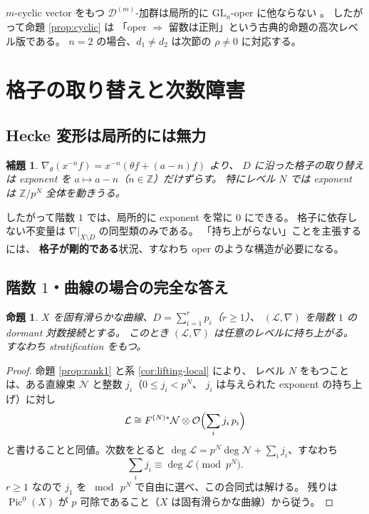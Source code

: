 \documentclass[a4paper,11pt]{ltjsarticle}
\theoremstyle{plain}
\newtheorem{proposition}[theorem]{命題}
\newtheorem{lemma}[theorem]{補題}
\theoremstyle{definition}
\newcommand{\bbZ}{\mathbb{Z}}
\newcommand{\cD}{\mathcal{D}}
\newcommand{\cL}{\mathcal{L}}
\newcommand{\cN}{\mathcal{N}}
\newcommand{\cO}{\mathcal{O}}
\newcommand{\Pic}{\operatorname{Pic}}
\begin{document}
$m$-cyclic vector をもつ $\cD^{(m)}$-加群は局所的に $\mathrm{GL}_n$-oper に他ならない
\cite[Prop.~4.2.3]{Wak}。
したがって命題 \ref{prop:cyclic} は
「oper $\Rightarrow$ 留数は正則」という古典的命題の高次レベル版である。
$n=2$ の場合、$d_1\neq d_2$ は次節の $\rho\neq0$ に対応する。

\section{格子の取り替えと次数障害}\label{sec:lattice}

\subsection{Hecke 変形は局所的には無力}

\begin{lemma}\label{lem:hecke}
$\nabla_\theta(x^{-n}f)=x^{-n}(\theta f+(a-n)f)$ より、
$D$ に沿った格子の取り替えは exponent を $a\mapsto a-n$（$n\in\bbZ$）だけずらす。
特にレベル $N$ では exponent は $\bbZ/p^N$ 全体を動きうる。
\end{lemma}

したがって階数 $1$ では、局所的に exponent を常に $0$ にできる。
格子に依存しない不変量は $\nabla|_{X\setminus D}$ の同型類のみである。
「持ち上がらない」ことを主張するには、
\textbf{格子が剛的である}状況、すなわち oper のような構造が必要になる。

\subsection{階数 $1$・曲線の場合の完全な答え}

\begin{proposition}\label{prop:rank1curve}
$X$ を固有滑らかな曲線、$D=\sum_{i=1}^r p_i$（$r\ge1$）、
$(\cL,\nabla)$ を階数 $1$ の dormant 対数接続とする。
このとき $(\cL,\nabla)$ は任意のレベルに持ち上がる。
すなわち stratification をもつ。
\end{proposition}

\begin{proof}
命題 \ref{prop:rank1} と系 \ref{cor:lifting-local} により、
レベル $N$ をもつことは、ある直線束 $\cN$ と整数 $j_i$（$0\le j_i<p^N$、
$j_i$ は与えられた exponent の持ち上げ）に対し
\[
  \cL\cong F^{(N)*}\cN\otimes\cO\Bigl(\sum_i j_i\,p_i\Bigr)
\]
と書けることと同値。次数をとると
$\deg\cL=p^N\deg\cN+\sum_i j_i$、すなわち
\[
  \sum_i j_i\equiv\deg\cL \pmod{p^N} .
\]
$r\ge1$ なので $j_1$ を $\bmod\,p^N$ で自由に選べ、この合同式は解ける。
残りは $\Pic^0(X)$ が $p$ 可除であること（$X$ は固有滑らかな曲線）から従う。
\end{proof}
\end{document}
